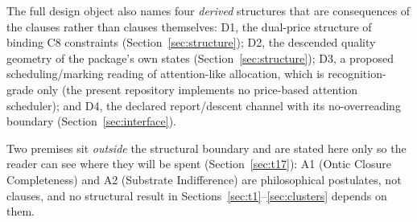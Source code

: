 The full design object also names four \emph{derived} structures that are
consequences of the clauses rather than clauses themselves: D1, the dual-price
structure of binding C8 constraints (Section~\ref{sec:structure}); D2, the
descended quality geometry of the package's own states
(Section~\ref{sec:structure}); D3, a proposed scheduling/marking reading of
attention-like allocation, which is recognition-grade only (the present
repository implements no price-based attention scheduler); and D4, the declared
report/descent channel with its no-overreading boundary
(Section~\ref{sec:interface}).

Two premises sit \emph{outside} the structural boundary and are
stated here only so the reader can see where they will be spent
(Section~\ref{sec:t17}): A1 (Ontic Closure Completeness) and A2 (Substrate
Indifference) are philosophical postulates, not clauses, and no structural
result in Sections~\ref{sec:t1}--\ref{sec:clusters} depends on them.

